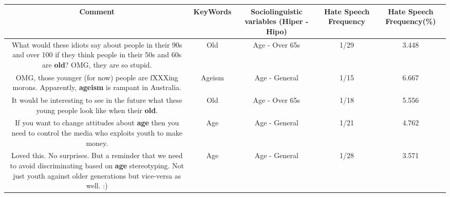\documentclass[11pt]{article}
\newlength\mylength
\begin{document}
\begin{center}
\setlength\mylength{\dimexpr\textwidth - 1\arrayrulewidth - 50\tabcolsep}
\begin{longtable}{|C{.65\mylength}|C{.30\mylength}|C{.12\mylength}|C{.12\mylength}|C{.12\mylength}|}
\hline
\textbf{Comment} & \textbf{KeyWords} & \textbf{Sociolinguistic variables (Hiper - Hipo)}  & \textbf{Hate Speech Frequency} & \textbf{Hate Speech Frequency(\%)} \\
\hline{}\small What would these idiots say about people in their 90s and over 100 if they think people in their 50s and 60s are \textbf{old}?   OMG, they are so stupid.\normalsize   & Old & Age - Over 65s & 1/29 & 3.448 \\  \hline
  \small OMG, those younger (for now) people are fXXXing morons.  Apparently, \textbf{ageism} is rampant in Australia.\normalsize   & Ageism & Age - General & 1/15 & 6.667 \\  \hline
  \small It would be interesting to see in the future what these young people look like when their \textbf{old}.\normalsize   & Old & Age - Over 65s & 1/18 & 5.556 \\  \hline
  \small If you want to change attitudes about \textbf{age} then you need to control the media who exploits youth to make money.\normalsize   & Age & Age - General & 1/21 & 4.762 \\  \hline
  \small Loved this. No surprises. But a reminder that we need to avoid discriminating based on \textbf{age} stereotyping. Not just youth against older generations but vice-versa as well. :)\normalsize   & Age & Age - General & 1/28 & 3.571 \\  \hline
  
\end{longtable}
\end{center}
\end{document}
